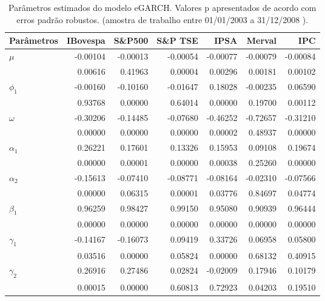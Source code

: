 \begin{table}[H]
\centering
\caption{Par\^ametros estimados do modelo eGARCH. Valores p apresentados de acordo 
com erros padrão robustos. (amostra de trabalho entre 01/01/2003 a 31/12/2008 ).} 
\label{tab:garchcoef}
\begin{tabular}{lrrrrrr}
  \hline
Parâmetros & IBovespa & S\&P500 & S\&P TSE & IPSA & Merval & IPC \\ 
  \hline
$\mu$ & -0.00104 & -0.00013 & -0.00054 & -0.00077 & -0.00079 & -0.00084 \\ 
   & 0.00616 & 0.41963 & 0.00004 & 0.00296 & 0.00181 & 0.00102 \\ 
  $\phi_1$ & -0.00160 & -0.10160 & -0.01647 & 0.18028 & -0.00235 & 0.06590 \\ 
   & 0.93768 & 0.00000 & 0.64014 & 0.00000 & 0.19700 & 0.00112 \\ 
  $\omega$ & -0.30206 & -0.14485 & -0.07680 & -0.46252 & -0.72657 & -0.31210 \\ 
   & 0.00000 & 0.00000 & 0.00000 & 0.00002 & 0.48937 & 0.00000 \\ 
  $\alpha_1$ & 0.26221 & 0.17601 & 0.13326 & 0.15953 & 0.09108 & 0.19674 \\ 
   & 0.00000 & 0.00001 & 0.00000 & 0.00038 & 0.25260 & 0.00000 \\ 
  $\alpha_2$ & -0.15613 & -0.07410 & -0.08771 & -0.08164 & -0.02310 & -0.07566 \\ 
   & 0.00000 & 0.06315 & 0.00001 & 0.03776 & 0.84697 & 0.04774 \\ 
  $\beta_1$ & 0.96259 & 0.98427 & 0.99150 & 0.95080 & 0.90939 & 0.96444 \\ 
   & 0.00000 & 0.00000 & 0.00000 & 0.00000 & 0.00000 & 0.00000 \\ 
  $\gamma_1$ & -0.14167 & -0.16073 & 0.09419 & 0.33726 & 0.06958 & 0.05800 \\ 
   & 0.03516 & 0.00000 & 0.05824 & 0.00000 & 0.68132 & 0.40915 \\ 
  $\gamma_2$ & 0.26916 & 0.27486 & 0.02824 & -0.02009 & 0.17946 & 0.10179 \\ 
   & 0.00015 & 0.00000 & 0.60813 & 0.72923 & 0.04203 & 0.19510 \\ 
   \hline
\end{tabular}
\end{table}
